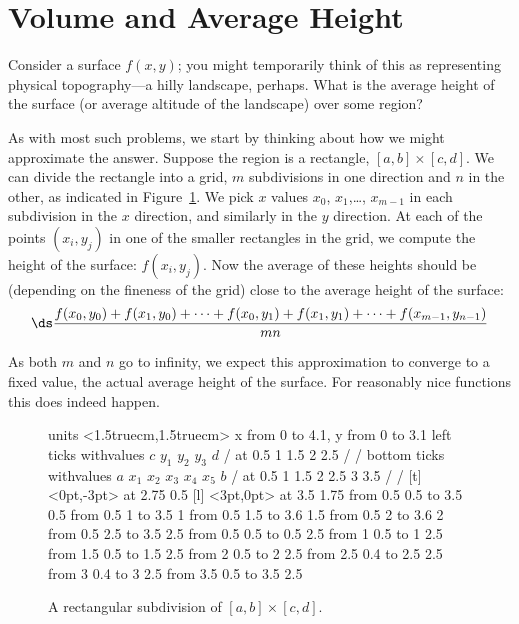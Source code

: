 \section{Volume and Average Height}\label{sec:VolumeAvgHeight}

Consider a surface $f(x,y)$; you might temporarily think of this as
representing physical topography---a hilly landscape, perhaps. What is
the average height of the surface (or average
altitude of the landscape) over some region?

As with most such problems, we start by thinking about how we
might approximate the answer. Suppose the region is a rectangle,
$[a,b]\times[c,d]$. We can divide the rectangle into a grid, $m$
subdivisions in one direction and $n$ in the other, as indicated in
Figure~\ref{fig:rectangulargrid}. We pick $x$ values $x_0$,
$x_1$,\dots, $x_{m-1}$ in each subdivision in the $x$ direction, and
similarly in the $y$ direction.
At each of the points $(x_i,y_j)$ in one of the smaller rectangles in
the grid, we
compute the height of the surface: $f(x_i,y_j)$. Now the average
of these heights should be (depending on the fineness of the grid)
close to the average height of the surface:
\[\ds\frac{f(x_0,y_0)+f(x_1,y_0)+\cdots+f(x_0,y_1)+f(x_1,y_1)+\cdots+
f(x_{m-1},y_{n-1})}{mn}\]

As both $m$ and $n$ go to infinity, we expect this approximation to
converge to a fixed value, the actual average height of the
surface. For reasonably nice functions this does indeed happen.

\begin{figure}[H]
\centerline{
\vbox{\beginpicture
\normalgraphs
\setcoordinatesystem units <1.5truecm,1.5truecm>
\setplotarea x from 0 to 4.1, y from 0 to 3.1
\axis left ticks withvalues $c$ $y_1$ $y_2$ $y_3$ $d$ / 
at 0.5 1 1.5 2 2.5 / /
\axis bottom ticks withvalues $a$ $x_1$ $x_2$ $x_3$ $x_4$ $x_5$ $b$ / 
at 0.5 1 1.5 2 2.5 3 3.5 / /
 [t] <0pt,-3pt> at 2.75 0.5
 [l] <3pt,0pt> at 3.5 1.75
\putrule from 0.5 0.5 to 3.5 0.5
\putrule from 0.5 1 to 3.5 1
\putrule from 0.5 1.5 to 3.6 1.5
\putrule from 0.5 2 to 3.6 2
\putrule from 0.5 2.5 to 3.5 2.5
\putrule from 0.5 0.5 to 0.5 2.5
\putrule from 1 0.5 to 1 2.5
\putrule from 1.5 0.5 to 1.5 2.5
\putrule from 2 0.5 to 2 2.5
\putrule from 2.5 0.4 to 2.5 2.5
\putrule from 3 0.4 to 3 2.5
\putrule from 3.5 0.5 to 3.5 2.5
\endpicture}}
\caption{A rectangular subdivision of $[a,b]\times[c,d]$.}
\label{fig:rectangulargrid}
\end{figure}

